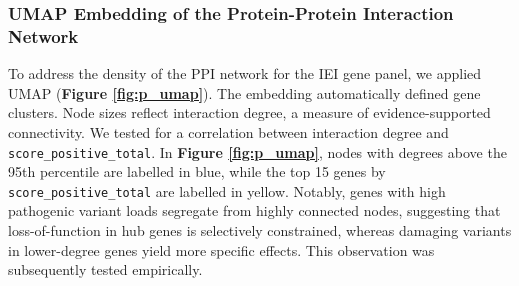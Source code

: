 %
%





\subsubsection{UMAP Embedding of the Protein-Protein Interaction Network}
To address the density of the PPI network for the IEI gene panel, we applied UMAP (\textbf{Figure \ref{fig:p_umap}}). The embedding automatically defined gene clusters. Node sizes reflect interaction degree, a measure of evidence-supported connectivity. We tested for a correlation between interaction degree and \texttt{score\_positive\_total}. In \textbf{Figure \ref{fig:p_umap}}, nodes with degrees above the 95th percentile are labelled in blue, while the top 15 genes by \texttt{score\_positive\_total} are labelled in yellow. Notably, genes with high pathogenic variant loads segregate from highly connected nodes, suggesting that loss-of-function in hub genes is selectively constrained, whereas damaging variants in lower-degree genes yield more specific effects. This observation was subsequently tested empirically.

